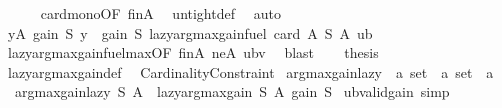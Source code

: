 \begin{isabellebody}
\ \ \ \ \isamarkupfalse%
\ card{\isacharunderscore}{\kern0pt}mono{\isacharbrackleft}{\kern0pt}OF\ finA{\isacharbrackright}{\kern0pt}\ \isamarkupfalse%
\ untight{\isacharunderscore}{\kern0pt}def\ \isamarkupfalse%
\ auto\isanewline
\ \ \isamarkupfalse%
\ {\isachardoublequoteopen}{\isasymforall}y{\isasymin}A{\isachardot}{\kern0pt}\ gain\ S\ y\ {\isasymle}\ gain\ S\ {\isacharparenleft}{\kern0pt}lazy{\isacharunderscore}{\kern0pt}argmax{\isacharunderscore}{\kern0pt}gain{\isacharunderscore}{\kern0pt}fuel\ {\isacharparenleft}{\kern0pt}card\ A{\isacharparenright}{\kern0pt}\ S\ A\ ub{\isacharparenright}{\kern0pt}{\isachardoublequoteclose}\isanewline
\ \ \ \ \isamarkupfalse%
\ lazy{\isacharunderscore}{\kern0pt}argmax{\isacharunderscore}{\kern0pt}gain{\isacharunderscore}{\kern0pt}fuel{\isacharunderscore}{\kern0pt}max{\isacharbrackleft}{\kern0pt}OF\ finA\ neA\ ubv{\isacharbrackright}{\kern0pt}\ \isamarkupfalse%
\ blast\isanewline
\ \ \isamarkupfalse%
\ {\isacharquery}{\kern0pt}thesis\isanewline
\ \ \ \ \isamarkupfalse%
\ lazy{\isacharunderscore}{\kern0pt}argmax{\isacharunderscore}{\kern0pt}gain{\isacharunderscore}{\kern0pt}def\ \isakeywordONE{{\isachardot}{\kern0pt}}\isamarkupfalse%
\isanewline
{}\isamarkupfalse%
%
\endisatagproof
{\isafoldproof}%
%
\isadelimproof
\isanewline
%
\endisadelimproof
\isanewline
{}\isamarkupfalse%
\isanewline
\isanewline
{}\isamarkupfalse%
\ Cardinality{\isacharunderscore}{\kern0pt}Constraint\isanewline
{}\isanewline
\isanewline
{}\isamarkupfalse%
\ argmax{\isacharunderscore}{\kern0pt}gain{\isacharunderscore}{\kern0pt}lazy\ {\isacharcolon}{\kern0pt}{\isacharcolon}{\kern0pt}\ {\isachardoublequoteopen}{\isacharprime}{\kern0pt}a\ set\ {\isasymRightarrow}\ {\isacharprime}{\kern0pt}a\ set\ {\isasymRightarrow}\ {\isacharprime}{\kern0pt}a{\isachardoublequoteclose}\ \isanewline
\ \ {\isachardoublequoteopen}argmax{\isacharunderscore}{\kern0pt}gain{\isacharunderscore}{\kern0pt}lazy\ S\ A\ {\isacharequal}{\kern0pt}\ lazy{\isacharunderscore}{\kern0pt}argmax{\isacharunderscore}{\kern0pt}gain\ S\ A\ {\isacharparenleft}{\kern0pt}gain\ S{\isacharparenright}{\kern0pt}{\isachardoublequoteclose}\isanewline
\isanewline
{}\isamarkupfalse%
\ ub{\isacharunderscore}{\kern0pt}valid{\isacharunderscore}{\kern0pt}gain\ {\isacharbrackleft}{\kern0pt}simp{\isacharbrackright}{\kern0pt}{\isacharcolon}{\kern0pt}\isanewline

\end{isabellebody}
